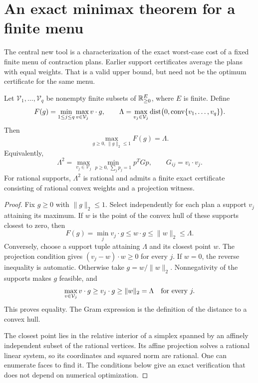 \section{An exact minimax theorem for a finite menu}
\label{sec:minimax}

The central new tool is a characterization of the exact worst-case cost of
a fixed finite menu of contraction plans. Earlier support certificates
average the plans with equal weights. That is a valid upper bound, but
need not be the optimum certificate for the same menu.

\begin{theorem}\label{thm:hull}
Let $\mathcal V_1,\ldots,\mathcal V_q$ be nonempty finite subsets of
$\mathbb R_{\ge0}^{E}$, where $E$ is finite. Define
\[
 F(g)=\min_{1\le j\le q}\max_{v\in\mathcal V_j}v\cdot g,
 \qquad
 \Lambda=\max_{v_j\in\mathcal V_j}
        \operatorname{dist}\bigl(0,\operatorname{conv}\{v_1,\ldots,v_q\}\bigr).
\]
Then
\begin{equation}\label{eq:hull-exact}
 \max_{g\ge0,\,\|g\|_2\le1}F(g)=\Lambda.
\end{equation}
Equivalently,
\[
 \Lambda^2=\max_{v_j\in\mathcal V_j}
       \min_{p\ge0,\,\sum_jp_j=1}p^TGp,
 \qquad G_{ij}=v_i\cdot v_j.
\]
For rational supports, $\Lambda^2$ is rational and admits a finite exact
certificate consisting of rational convex weights and a projection witness.
\end{theorem}

\begin{proof}
Fix $g\ge0$ with $\|g\|_2\le1$. Select independently for each plan a
support $v_j$ attaining its maximum. If $w$ is the point of the convex
hull of these supports closest to zero, then
\[
 F(g)=\min_jv_j\cdot g\le w\cdot g\le\|w\|_2\le\Lambda.
\]
Conversely, choose a support tuple attaining $\Lambda$ and its closest
point $w$. The projection condition gives
$(v_j-w)\cdot w\ge0$ for every $j$. If $w=0$, the reverse inequality
is automatic. Otherwise take $g=w/\|w\|_2$. Nonnegativity of the
supports makes $g$ feasible, and
\[
 \max_{v\in\mathcal V_j}v\cdot g
 \ge v_j\cdot g\ge\|w\|_2=\Lambda
 \quad\hbox{for every }j.
\]
This proves equality. The Gram expression is the definition of the
distance to a convex hull.

The closest point lies in the relative interior of a simplex spanned by an
affinely independent subset of the rational vertices. Its affine projection solves a rational
linear system, so its coordinates and squared norm are rational. One can
enumerate faces to find it. The conditions below give an exact verification
that does not depend on numerical optimization.
\end{proof}

